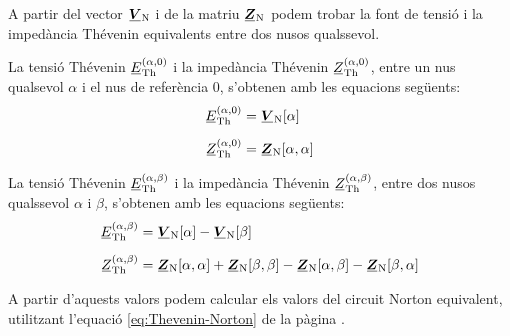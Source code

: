 A partir del vector $\mcmplx{V}\ped{N}$ i de la matriu
$\mcmplx{Z}\ped{N}$ podem trobar la font de tensió i la impedància
Thévenin equivalents entre dos nusos qualssevol.

La tensió Thévenin $\cmplx{E}\ped{Th}^{(\alpha,0)}$ i la impedància
Thévenin $\cmplx{Z}\ped{Th}^{(\alpha,0)}$, entre  un nus qualsevol
$\alpha$ i el nus de referència 0, s'obtenen amb les equacions
següents:
\begin{align}
    \cmplx{E}\ped{Th}^{(\alpha,0)} &= \mcmplx{V}\ped{N}[\alpha] \\[2mm]
    \cmplx{Z}\ped{Th}^{(\alpha,0)} &= \mcmplx{Z}\ped{N}[\alpha,\alpha]
\end{align}

La tensió Thévenin $\cmplx{E}\ped{Th}^{(\alpha,\beta)}$ i la
impedància Thévenin $\cmplx{Z}\ped{Th}^{(\alpha,\beta)}$, entre dos
nusos qualssevol $\alpha$ i $\beta$, s'obtenen amb les equacions
següents:
\begin{align}
    \cmplx{E}\ped{Th}^{(\alpha,\beta)} &= \mcmplx{V}\ped{N}[\alpha] - \mcmplx{V}\ped{N}[\beta] \\[2mm]
    \cmplx{Z}\ped{Th}^{(\alpha,\beta)} &= \mcmplx{Z}\ped{N}[\alpha,\alpha] +
    \mcmplx{Z}\ped{N}[\beta,\beta] - \mcmplx{Z}\ped{N}[\alpha,\beta] -
    \mcmplx{Z}\ped{N}[\beta,\alpha]
\end{align}

A partir d'aquests valors podem calcular els valors del circuit Norton equivalent, utilitzant l'equació \eqref{eq:Thevenin-Norton} de la pàgina \pageref{eq:Thevenin-Norton}.


